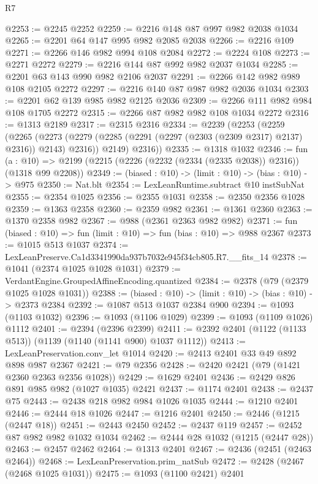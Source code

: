 \begin{lexlean}{R7}
\begin{coremodule}
@2253 := @2245 @2252
@2259 := @2216 @148 @87 @997 @982 @2038 @1034
@2265 := @2201 @64 @147 @995 @982 @2085 @2038
@2266 := @2216 @109
@2271 := @2266 @146 @982 @994 @108 @2084
@2272 := @2224 @108
@2273 := @2271 @2272
@2279 := @2216 @144 @87 @992 @982 @2037 @1034
@2285 := @2201 @63 @143 @990 @982 @2106 @2037
@2291 := @2266 @142 @982 @989 @108 @2105 @2272
@2297 := @2216 @140 @87 @987 @982 @2036 @1034
@2303 := @2201 @62 @139 @985 @982 @2125 @2036
@2309 := @2266 @111 @982 @984 @108 @1705 @2272
@2315 := @2266 @87 @982 @982 @108 @1034 @2272
@2316 := @1313 @2189
@2317 := @2315 @2316
@2334 := @2239
    (@2253
      (@2259
        (@2265
          (@2273 (@2279 (@2285 (@2291 (@2297 (@2303 (@2309 @2317) @2137) @2316)) @2143) @2316))
          @2149)
        @2316))
@2335 := @1318 @1032
@2346 := fun (a : @10) =>
  @2199 (@2215 (@2226 (@2232 (@2334 (@2335 @2038)) @2316)) (@1318 @99 @2208))
@2349 := (biased : @10) -> (limit : @10) -> (bias : @10) -> @975
@2350 := Nat.blt
@2354 := LexLeanRuntime.subtract @10 instSubNat
@2355 := @2354 @1025
@2356 := @2355 @1031
@2358 := @2350 @2356 @1028
@2359 := @1363 @2358
@2360 := @2359 @982
@2361 := @1361 @2360
@2363 := @1370 @2358 @982
@2367 := @988 (@2361 @2363 @982 @982)
@2371 := fun (biased : @10) => fun (limit : @10) => fun (bias : @10) => @988 @2367
@2373 := @1015 @513 @1037
@2374 := LexLeanPreserve.Ca1d3341990da937b7032e945f34cb805.R7.__fits_14
@2378 := @1041 (@2374 @1025 @1028 @1031)
@2379 := VerdantEngine.GroupedAffineEncoding.quantized
@2384 := @2378 (@79 (@2379 @1025 @1028 @1031))
@2388 := (biased : @10) -> (limit : @10) -> (bias : @10) -> @2373 @2384
@2392 := @1087 @513 @1037 @2384 @900
@2394 := @1093 (@1103 @1032)
@2396 := @1093 (@1106 @1029)
@2399 := @1093 (@1109 @1026) @1112
@2401 := @2394 (@2396 @2399)
@2411 := @2392 @2401 (@1122 (@1133 @513)) (@1139 (@1140 (@1141 @900) @1037 @1112))
@2413 := LexLeanPreservation.conv_let @1014
@2420 := @2413 @2401 @33 @49 @892 @898 @987 @2367
@2421 := @79 @2356
@2428 := @2420 @2421 (@79 (@1421 @2360 @2363 @2356 @1028))
@2429 := @1629 @2401
@2436 := @2429 @826 @891 @985 @982 (@1027 @1035) @2421
@2437 := @1174 @2401
@2438 := @2437 @75
@2443 := @2438 @218 @982 @984 @1026 @1035
@2444 := @1210 @2401
@2446 := @2444 @18 @1026
@2447 := @1216 @2401
@2450 := @2446 (@1215 (@2447 @18))
@2451 := @2443 @2450
@2452 := @2437 @119
@2457 := @2452 @87 @982 @982 @1032 @1034
@2462 := @2444 @28 @1032 (@1215 (@2447 @28))
@2463 := @2457 @2462
@2464 := @1313 @2401
@2467 := @2436 (@2451 (@2463 @2464))
@2468 := LexLeanPreservation.prim_natSub
@2472 := @2428 (@2467 (@2468 @1025 @1031))
@2475 := @1093 (@1100 @2421) @2401

\end{coremodule}
\end{lexlean}
